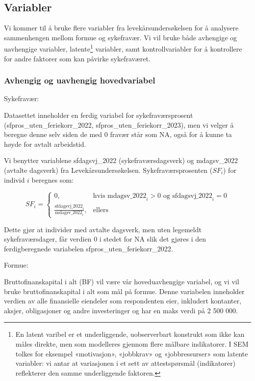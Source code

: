 \documentclass[
  12pt,
  a4paper,
  DIV=11,
  numbers=noendperiod]{scrartcl}
\begin{document}
\subsection{Variabler}\label{variabler}

Vi kommer til å bruke flere variabler fra levekårsundersøkelsen for å
analysere sammenhengen mellom formue og sykefravær. Vi vil bruke både
avhengige og uavhengige variabler, latente\footnote{En latent varibel er
  et underliggende, uobserverbart konstrukt som ikke kan måles direkte,
  men som modelleres gjennom flere målbare indikatorer. I SEM tolkes for
  eksempel «motivasjon», «jobbkrav» og «jobbressurser» som latente
  variabler: vi antar at variasjonen i et sett av attestspørsmål
  (indikatorer) reflekterer den samme underliggende faktoren.}
variabler, samt kontrollvariabler for å kontrollere for andre faktorer
som kan påvirke sykefraværet.

\subsubsection{Avhengig og uavhengig
hovedvariabel}\label{avhengig-og-uavhengig-hovedvariabel}

Sykefravær:

Datasettet inneholder en ferdig variabel for sykefraværsprosent
(sfpros\_uten\_feriekorr\_2022, sfpros\_uten\_feriekorr\_2023), men vi
velger å beregne denne selv siden de med 0 fravær står som NA, også for
å kunne ta høyde for avtalt arbeidstid.

Vi benytter variablene sfdagsvj\_2022 (sykefraværsdagsverk) og
mdagsv\_2022 (avtalte dagsverk) fra Levekårsundersøkelsen.
Sykefraværsprosenten (\(SF_i\)) for individ \(i\) beregnes som:

\[
SF_i = 
\begin{cases}
0, & \text{hvis } \mathrm{mdagsv\_2022}_i > 0 \text{ og } \mathrm{sfdagsvj\_2022}_i = 0 \\
\frac{ \mathrm{sfdagsvj\_2022}_i }{ \mathrm{mdagsv\_2022}_i }, & \text{ellers}
\end{cases}
\]

Dette gjør at individer med avtalte dagsverk, men uten legemeldt
sykefraværsdager, får verdien 0 i stedet for NA slik det gjøres i den
ferdigberegnede variabelen sfpros\_uten\_feriekorr\_2022.

Formue:

Bruttofinanskapital i alt (BF) vil være vår hoveduavhengige variabel, og
vi vil bruke bruttofinanskapital i alt som mål på formue. Denne
variabelen inneholder verdien av alle finansielle eiendeler som
respondenten eier, inkludert kontanter, aksjer, obligasjoner og andre
investeringer og har en maks verdi på 2 500 000.
\end{document}
